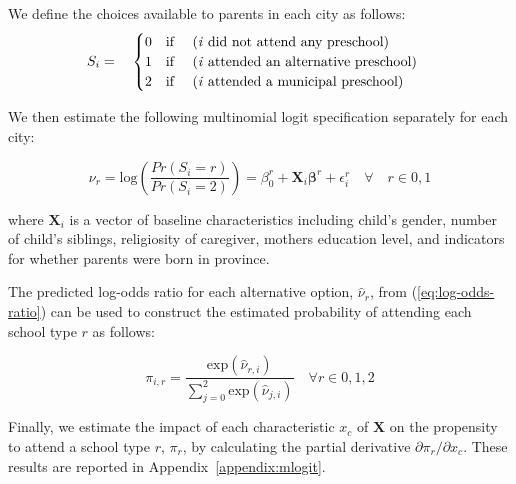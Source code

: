 We define the choices available to parents in each city as follows:
\begin{equation}
S_i = \quad
\begin{cases}
0 \quad \text{if \quad (\textit{i} did not attend any preschool)} \\
1 \quad  \text{if \quad (\textit{i} attended an alternative preschool)} \\
2 \quad \text{if \quad (\textit{i} attended a municipal preschool)}  \\
\end{cases}
\end{equation}

\noindent We then estimate the following multinomial logit specification separately for each city:

\begin{equation} \label{eq:log-odds-ratio}
\nu_r = \text{log} \left(\frac{Pr(S_i=r)}{Pr(S_i=2)}\right) = \beta_0^r +  \bm{X}_i\bm{\beta}^r + \epsilon_i^r \quad \forall \quad r \in 0,1
\end{equation}

\noindent where $\bm{X}_i$ is a vector of baseline characteristics including child's gender, number of child's siblings, religiosity of caregiver, mothers education level, and indicators for whether parents were born in province.

The predicted log-odds ratio for each alternative option, $\hat{\nu}_r$, from (\ref{eq:log-odds-ratio}) can be used to construct the estimated probability of attending each school type $r$ as follows:

\begin{equation}
\pi_{i,r} = \frac{\text{exp}(\hat{\nu}_{r,i})}{\sum\limits_{j=0}^{2} \text{exp}(\hat{\nu}_{j,i})} \quad \forall  r \in 0,1,2
\end{equation}

Finally, we estimate the impact of each characteristic $x_c$ of $\bm{X}$ on the propensity to attend a school type $r$, $\pi_{r}$, by calculating the partial derivative $\partial \pi_{r}/\partial x_c$. These results are reported in Appendix~\ref{appendix:mlogit}. 

